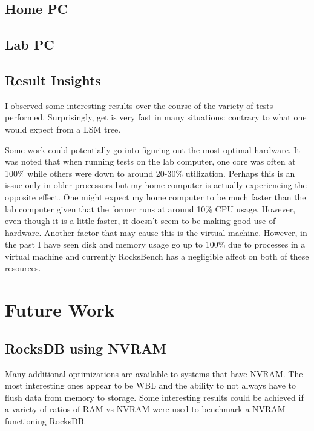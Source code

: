 \documentclass[twocolumn,11pt]{article}
\begin{document}
\subsection{Home PC}


\subsection{Lab PC}


\subsection{Result Insights}
\label{subsec:res_insights}


I observed some interesting results over the course of the variety of tests
performed. Surprisingly, get is very fast in many situations: contrary to what
one would expect from a LSM tree.

Some work could potentially go into figuring out the most optimal hardware. It
was noted that when running tests on the lab computer, one core was often at
100\% while others were down to around 20-30\% utilization. Perhaps this is an
issue only in older processors but my home computer is actually experiencing the
opposite effect. One might expect my home computer to be much faster than the
lab computer given that the former runs at around 10\% CPU usage. However, even
though it is a little faster, it doesn't seem to be making good use of hardware.
Another factor that may cause this is the virtual machine. However, in the past
I have seen disk and memory usage go up to 100\% due to processes in a virtual
machine and currently RocksBench has a negligible affect on both of these
resources.

\section{Future Work}
\label{sec:future_work}

\subsection{RocksDB using NVRAM}

Many additional optimizations are available to systems that have NVRAM. The most
interesting ones appear to be WBL and the ability to not always have to flush
data from memory to storage. Some interesting results could be achieved if a
variety of ratios of RAM vs NVRAM were used to benchmark a NVRAM functioning
RocksDB.
\end{document}
